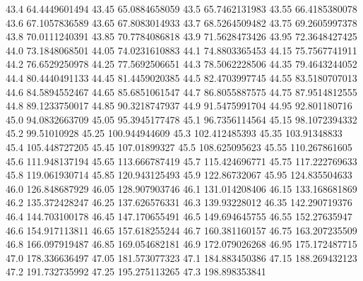            43.4    64.4449601494
          43.45    65.0884658059
           43.5    65.7462131983
          43.55    66.4185380078
           43.6    67.1057836589
          43.65    67.8083014933
           43.7    68.5264509482
          43.75    69.2605997378
           43.8    70.0111240391
          43.85    70.7784086818
           43.9    71.5628473426
          43.95    72.3648427425
           44.0    73.1848068501
          44.05    74.0231610883
           44.1    74.8803365453
          44.15    75.7567741911
           44.2    76.6529250978
          44.25    77.5692506651
           44.3    78.5062228506
          44.35    79.4643244052
           44.4    80.4440491133
          44.45    81.4459020385
           44.5    82.4703997745
          44.55    83.5180707013
           44.6    84.5894552467
          44.65    85.6851061547
           44.7    86.8055887575
          44.75    87.9514812555
           44.8    89.1233750017
          44.85    90.3218747937
           44.9    91.5475991704
          44.95     92.801180716
           45.0    94.0832663709
          45.05    95.3945177478
           45.1    96.7356114564
          45.15    98.1072394332
           45.2      99.51010928
          45.25    100.944944609
           45.3    102.412485393
          45.35     103.91348833
           45.4    105.448727205
          45.45     107.01899327
           45.5    108.625095623
          45.55    110.267861605
           45.6    111.948137194
          45.65    113.666787419
           45.7    115.424696771
          45.75    117.222769633
           45.8    119.061930714
          45.85    120.943125493
           45.9     122.86732067
          45.95    124.835504633
           46.0    126.848687929
          46.05    128.907903746
           46.1    131.014208406
          46.15    133.168681869
           46.2    135.372428247
          46.25    137.626576331
           46.3     139.93228012
          46.35    142.290719376
           46.4    144.703100178
          46.45    147.170655491
           46.5    149.694645755
          46.55     152.27635947
           46.6    154.917113811
          46.65    157.618255244
           46.7    160.381160157
          46.75    163.207235509
           46.8    166.097919487
          46.85    169.054682181
           46.9    172.079026268
          46.95    175.172487715
           47.0    178.336636497
          47.05    181.573077323
           47.1    184.883450386
          47.15    188.269432123
           47.2    191.732735992
          47.25    195.275113265
           47.3    198.898353841
